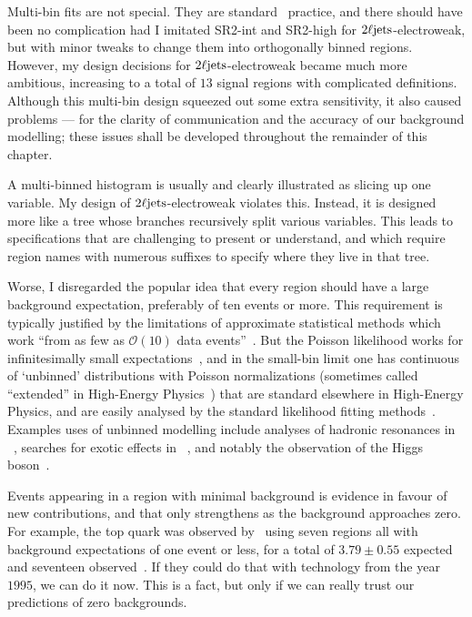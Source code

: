 Multi-bin fits are not special.
They are standard \atlas\ practice, and there should have been no complication
had I imitated SR2-int and SR2-high for $2\ell\mathrm{jets}$-electroweak, but with minor
tweaks to change them into orthogonally binned regions.
However, my design decisions for $2\ell\mathrm{jets}$-electroweak became much more
ambitious, increasing to a total of $13$ signal regions with complicated
definitions.
Although this multi-bin design squeezed out some extra sensitivity,
it also caused problems --- for the clarity of communication and the accuracy
of our background modelling;
these issues shall be developed throughout the remainder of this chapter.

A multi-binned histogram is usually and clearly illustrated as slicing up one
variable.
My design of $2\ell\mathrm{jets}$-electroweak violates this.
Instead, it is designed more like a tree whose branches recursively split
various variables.
This leads to specifications that are challenging to present or understand,
and which require region names with numerous suffixes to specify where they
live in that tree.

Worse, I disregarded the popular idea that every region should have a large
background expectation, preferably of ten events or more.
This requirement is typically justified by the limitations of approximate
statistical methods which work
``from as few as $\mathcal{O}(10)$ data events''~\cite{baak2015histfitter}.
But the Poisson likelihood works for infinitesimally small
expectations~\cite{skilling2009cosmology}, and in the small-bin limit one has
continuous of `unbinned' distributions with Poisson normalizations
(sometimes called ``extended'' in High-Energy
Physics~\cite{barlow1990extended})
that are standard elsewhere in High-Energy Physics,
and are easily analysed by the standard likelihood fitting
methods~\cite{cowan1998statistical}.
Examples uses of unbinned modelling include analyses of hadronic
resonances in
\lhcb~\cite{Tullythesis,lhcb2018563}, searches for exotic effects in
\atlas~\cite{EXOT-2018-08},
and notably the observation of the
Higgs boson~\cite{HIGG-2012-27}.

Events appearing in a region with minimal background is evidence in favour
of new contributions, and that only strengthens as the background approaches
zero.
For example, the top quark was observed by \dzero\ using seven regions all with
background expectations of one event or less, for a total of $3.79\pm0.55$
expected and seventeen observed~\cite{abachi1995observation}.
If they could do that with technology from the year $1995$, we can do it now.
This is a fact, but only if we can really trust our predictions of zero
backgrounds.

